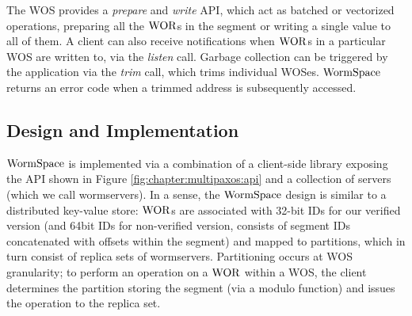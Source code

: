 The WOS provides a \textit{prepare} and \textit{write} API, which act as batched or vectorized operations, preparing all the $\mathrm{WOR}$s in the segment or writing a single value to all of them.
A client can also receive notifications when $\mathrm{WOR}$s in a particular WOS are written to, via the \textit{listen} call.
Garbage collection can be triggered by the application via the \textit{trim} call, which trims individual WOSes. 
$\mathrm{WormSpace}$ returns an error code when a trimmed address is subsequently accessed.






\subsection{Design and Implementation}
\label{chapter:wormspace:subsec:design-and-implementation}


$\mathrm{WormSpace}$ is implemented via a combination of a client-side library exposing the API shown in Figure \ref{fig:chapter:multipaxos:api} and a collection of servers (which we call wormservers). In a sense, the $\mathrm{WormSpace}$ design is similar to a distributed key-value store: $\mathrm{WOR}$s are associated with 32-bit IDs for our verified version (and 64bit IDs for non-verified version, consists of segment IDs concatenated with offsets within the segment) and mapped to partitions, which in turn consist of replica sets of wormservers. Partitioning occurs at WOS granularity; to perform an operation on a $\mathrm{WOR}$ within a WOS, the client determines the partition storing the segment (via a modulo function) and issues the operation to the replica set.

